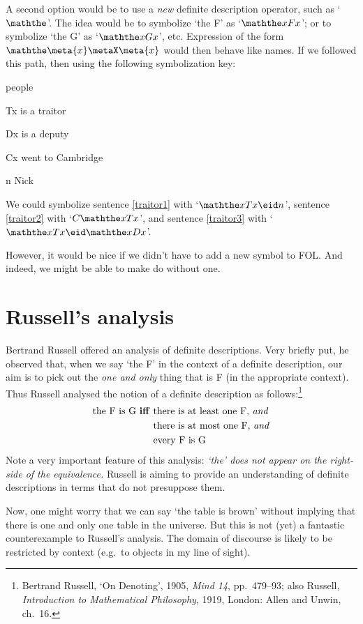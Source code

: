 A second option would be to use a \emph{new} definite description operator, such as `$\maththe$'. The idea would be to symbolize `the F' as `$\maththe xFx$'; or to symbolize `the G' as `$\maththe xGx$', etc. Expression of the form $\maththe \meta{x} \metaX\meta{x}$ would then behave like names. If we followed this path, then using the following symbolization key:
	\begin{ekey}
		\item[\text{domain}] people
		\item[Tx]  is a traitor
		\item[Dx]  is a deputy
		\item[Cx]  went to Cambridge
		\item[n] Nick
	\end{ekey}
We could symbolize sentence \ref{traitor1} with `$\maththe x Tx \eid  n$', sentence \ref{traitor2} with `$C\maththe xTx$', and sentence \ref{traitor3} with `$\maththe x Tx \eid  \maththe x Dx$'.

However, it would be nice if we didn't have to add a new symbol to FOL. And indeed, we might be able to make do without one.

\section{Russell's analysis}
Bertrand Russell offered an analysis of definite descriptions. Very briefly put, he observed that, when we say `the F' in the context of a definite description, our aim is to pick out the \emph{one and only} thing that is F (in the appropriate context). Thus Russell analysed the notion of a definite description as follows:\footnote{Bertrand Russell, `On Denoting', 1905, \emph{Mind 14}, pp.\ 479--93; also Russell, \emph{Introduction to Mathematical Philosophy}, 1919, London: Allen and Unwin, ch.\ 16.}
	\begin{align*}
		\text{the F is G \textbf{iff} }&\text{there is at least one F, \emph{and}}\\
	&\text{there is at most one F, \emph{and}}\\
	&\text{every F is G}
\end{align*}
Note a very important feature of this analysis: \emph{`the' does not appear on the right-side of the equivalence.} Russell is aiming to provide an understanding of definite descriptions in terms that do not presuppose them.

Now, one might worry that we can say `the table is brown' without implying that there is one and only one table in the universe. But this is not (yet) a fantastic counterexample to Russell's analysis. The domain of discourse is likely to be restricted by context (e.g.\ to objects in my line of sight).


